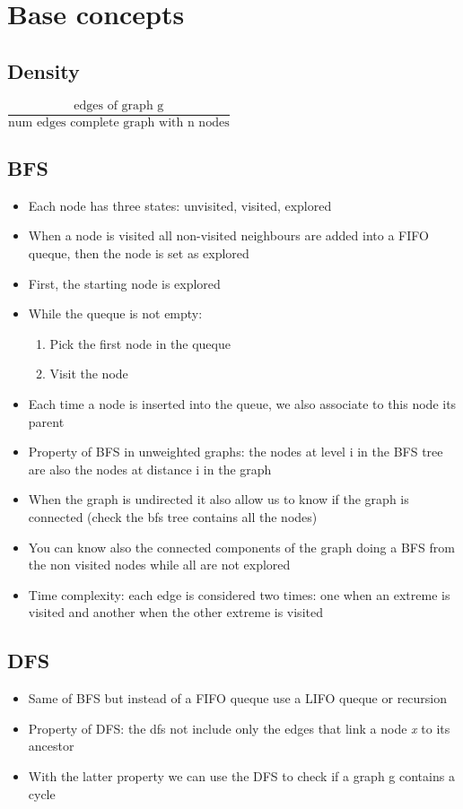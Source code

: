 \documentclass[10pt,a4paper]{book}
\begin{document}
			\tableofcontents
			\newpage
			\chapter{Base concepts}
			\section{Density}
			$\dfrac{\text{edges of graph g}}{\text{num edges complete graph with n nodes}}$
			\section{BFS}
			\begin{itemize}
				\item Each node has three states: unvisited, visited, explored
				\item When a node is visited all non-visited neighbours are added into a FIFO queque, then the node is set as explored
				\item First, the starting node is explored
				\item While the queque is not empty:
				\begin{enumerate}
					\item Pick the first node in the queque
					\item Visit the node
				\end{enumerate}
			\item Each time a node is inserted into the queue, we also associate to this node its parent
			\item Property of BFS in unweighted graphs: the nodes at level i in the BFS tree are also the nodes at distance i in the graph
			\item When the graph is undirected it also allow us to know if the graph is connected (check the bfs tree contains all the nodes)
			\item You can know also the connected components of the graph doing a BFS from the non visited nodes while all are not explored
			\item Time complexity: each edge is considered two times: one when an extreme is visited and another when the other extreme is visited
			
			\end{itemize}
			\section{DFS}
			\begin{itemize}
				\item Same of BFS but instead of a FIFO queque use a LIFO queque or recursion
				\item Property of DFS: the dfs not include only the edges that link a node \textit{x} to its ancestor
				\item With the latter property we can use the DFS to check if a graph g contains a cycle
			\end{itemize}
\end{document}
